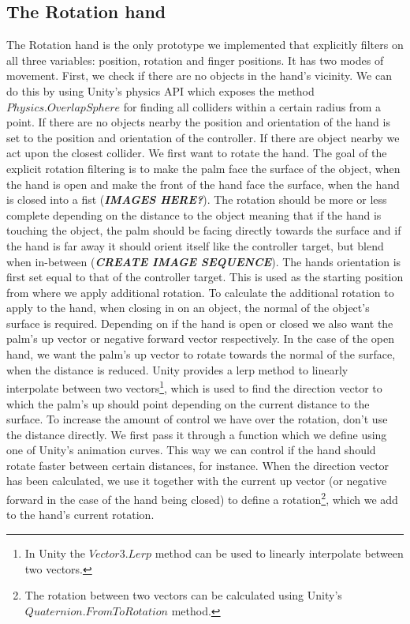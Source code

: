 \subsection{The Rotation hand}
\label{subsec:rotationHand}
The Rotation hand is the only prototype we implemented that explicitly filters on all three variables: position, rotation and finger positions. It has two modes of movement. First, we check if there are no objects in the hand's vicinity. We can do this by using Unity's physics API which exposes the method $Physics.OverlapSphere$ for finding all colliders within a certain radius from a point. If there are no objects nearby the position and orientation of the hand is set to the position and orientation of the controller. If there are object nearby we act upon the closest collider. We first want to rotate the hand. The goal of the explicit rotation filtering is to make the palm face the surface of the object, when the hand is open and make the front of the hand face the surface, when the hand is closed into a fist (\textbf{\textit{IMAGES HERE?}}). The rotation should be more or less complete depending on the distance to the object meaning that if the hand is touching the object, the palm should be facing directly towards the surface and if the hand is far away it should orient itself like the controller target, but blend when in-between (\textbf{\textit{CREATE IMAGE SEQUENCE}}). The hands orientation is first set equal to that of the controller target. This is used as the starting position from where we apply additional rotation. To calculate the additional rotation to apply to the hand, when closing in on an object, the normal of the object's surface is required. Depending on if the hand is open or closed we also want the palm's up vector or negative forward vector respectively. In the case of the open hand, we want the palm's up vector to rotate towards the normal of the surface, when the distance is reduced. Unity provides a lerp method to linearly interpolate between two vectors\footnote{In Unity the $Vector3.Lerp$ method can be used to linearly interpolate between two vectors.}, which is used to find the direction vector to which the palm's up should point depending on the current distance to the surface. To increase the amount of control we have over the rotation, don't use the distance directly. We first pass it through a function which we define using one of Unity's animation curves. This way we can control if the hand should rotate faster between certain distances, for instance. When the direction vector has been calculated, we use it together with the current up vector (or negative forward in the case of the hand being closed) to define a rotation\footnote{The rotation between two vectors can be calculated using Unity's $Quaternion.FromToRotation$ method.}, which we add to the hand's current rotation.


